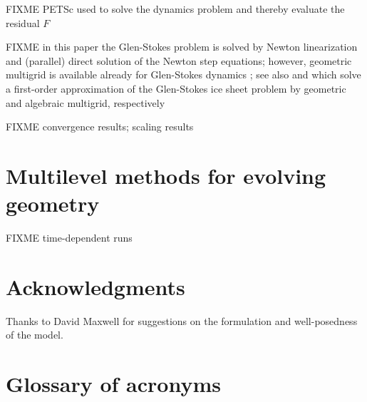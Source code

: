 \documentclass[letterpaper,final,12pt,reqno]{amsart}
\theoremstyle{claim}
\numberwithin{equation}{section}
\numberwithin{figure}{section}
\numberwithin{table}{section}
\numberwithin{theorem}{section}
\begin{document}
FIXME PETSc \cite{Balayetal2020,Bueler2021} used to solve the dynamics problem and thereby evaluate the residual $F$

FIXME in this paper the Glen-Stokes problem is solved by Newton linearization and (parallel) direct solution of the Newton step equations; however, geometric multigrid is available already for Glen-Stokes dynamics \cite{IsaacStadlerGhattas2015}; see also \cite{BrownSmithAhmadia2013} and \cite{Tuminaroetal2016} which solve a first-order approximation of the Glen-Stokes ice sheet problem by geometric and algebraic multigrid, respectively

FIXME convergence results; scaling results

\section{Multilevel methods for evolving geometry} \label{sec:evolution}

FIXME time-dependent runs


\section*{Acknowledgments}  Thanks to David Maxwell for suggestions on the formulation and well-posedness of the model.

\small

\bigskip



\appendix

\section{Glossary of acronyms} \label{app:glossary}
\end{document}
